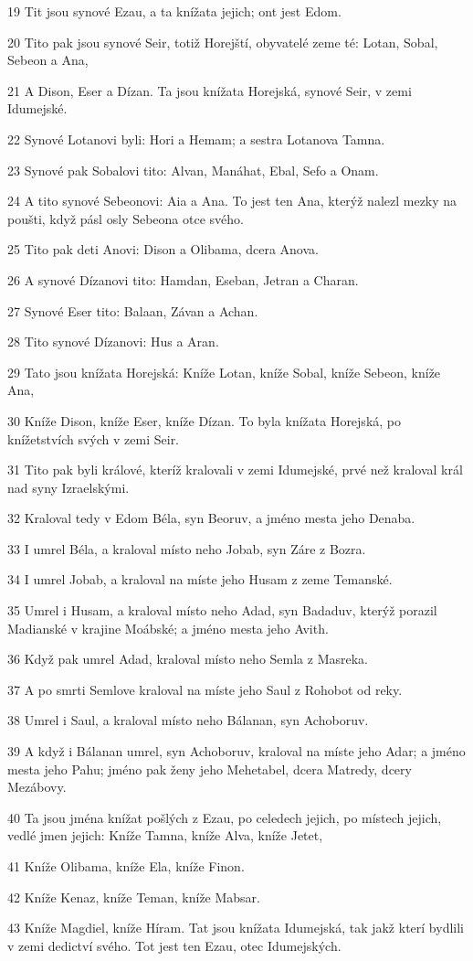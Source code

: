 \par 19 Tit jsou synové Ezau, a ta knížata jejich; ont jest Edom.
\par 20 Tito pak jsou synové Seir, totiž Horejští, obyvatelé zeme té: Lotan, Sobal, Sebeon a Ana,
\par 21 A Dison, Eser a Dízan. Ta jsou knížata Horejská, synové Seir, v zemi Idumejské.
\par 22 Synové Lotanovi byli: Hori a Hemam; a sestra Lotanova Tamna.
\par 23 Synové pak Sobalovi tito: Alvan, Manáhat, Ebal, Sefo a Onam.
\par 24 A tito synové Sebeonovi: Aia a Ana. To jest ten Ana, kterýž nalezl mezky na poušti, když pásl osly Sebeona otce svého.
\par 25 Tito pak deti Anovi: Dison a Olibama, dcera Anova.
\par 26 A synové Dízanovi tito: Hamdan, Eseban, Jetran a Charan.
\par 27 Synové Eser tito: Balaan, Závan a Achan.
\par 28 Tito synové Dízanovi: Hus a Aran.
\par 29 Tato jsou knížata Horejská: Kníže Lotan, kníže Sobal, kníže Sebeon, kníže Ana,
\par 30 Kníže Dison, kníže Eser, kníže Dízan. To byla knížata Horejská, po knížetstvích svých v zemi Seir.
\par 31 Tito pak byli králové, kteríž kralovali v zemi Idumejské, prvé než kraloval král nad syny Izraelskými.
\par 32 Kraloval tedy v Edom Béla, syn Beoruv, a jméno mesta jeho Denaba.
\par 33 I umrel Béla, a kraloval místo neho Jobab, syn Záre z Bozra.
\par 34 I umrel Jobab, a kraloval na míste jeho Husam z zeme Temanské.
\par 35 Umrel i Husam, a kraloval místo neho Adad, syn Badaduv, kterýž porazil Madianské v krajine Moábské; a jméno mesta jeho Avith.
\par 36 Když pak umrel Adad, kraloval místo neho Semla z Masreka.
\par 37 A po smrti Semlove kraloval na míste jeho Saul z Rohobot od reky.
\par 38 Umrel i Saul, a kraloval místo neho Bálanan, syn Achoboruv.
\par 39 A když i Bálanan umrel, syn Achoboruv, kraloval na míste jeho Adar; a jméno mesta jeho Pahu; jméno pak ženy jeho Mehetabel, dcera Matredy, dcery Mezábovy.
\par 40 Ta jsou jména knížat pošlých z Ezau, po celedech jejich, po místech jejich, vedlé jmen jejich: Kníže Tamna, kníže Alva, kníže Jetet,
\par 41 Kníže Olibama, kníže Ela, kníže Finon.
\par 42 Kníže Kenaz, kníže Teman, kníže Mabsar.
\par 43 Kníže Magdiel, kníže Híram. Tat jsou knížata Idumejská, tak jakž kterí bydlili v zemi dedictví svého. Tot jest ten Ezau, otec Idumejských.

